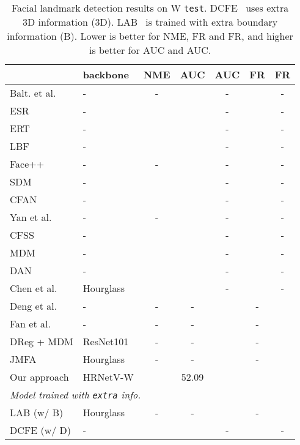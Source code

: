 \documentclass[10pt,twocolumn,letterpaper]{article}
\begin{document}
\renewcommand{\arraystretch}{1.3}
\begin{table}[t]
\setlength{\tabcolsep}{1.8pt}
\scriptsize
\centering
\caption{Facial landmark detection results on W \texttt{test}.
DCFE~\cite{ValleBVB18} uses extra 3D information (3D).
LAB~\cite{Wu0YWC018} is trained with extra boundary information (B).
Lower is better for NME, FR and FR,
and higher is better for AUC and AUC.}
\label{table:comparison_300w_testset}
\begin{tabular}{l|l|c|c|c|c|c}
\hline\noalign{\smallskip}
 & backbone &NME & AUC & AUC & FR & FR\\
\hline

\hline
Balt. et al. \cite{Baltrusaitis0M13} & - & - & &-&  & -\\
ESR \cite{CaoWWS12}& - & &  & - &  & - \\
ERT \cite{KazemiS14}& - & &  & - &  & - \\
LBF \cite{RenCW014}& - & &  & - &  & - \\
Face++ \cite{ZhouFCJY13} & - & - & & - &  & - \\
SDM \cite{XiongT13}& - & &  & - &  & - \\
CFAN \cite{ZhangSKC14}& - & &  & - &  & - \\
Yan et al. \cite{YanLYL13} & -&- &&-&&-\\
CFSS \cite{ZhuLLT15}& - & &  & - &  & - \\
MDM \cite{TrigeorgisSNAZ16}& - & &  & - &  & - \\
DAN \cite{KowalskiNT17}& - & &  & - &  & - \\
Chen et al. \cite{ChenSWLY17}& Hourglass & &  & - &  & - \\
Deng et al. \cite{DengLYT16}& - & - & - &  & - &  \\
Fan et al. \cite{FanZ16}& - &- & - &  & - &  \\
DReg + MDM \cite{GulerTASZK17}& ResNet101 &- & - &  & - &  \\
JMFA \cite{DengTZZ17}&Hourglass &- & - &  & - &  \\
\hline
Our approach & HRNetV-W&   & 52.09  &  &  &   \\
\hline

\hline
\multicolumn{3}{l}{
\emph {Model trained with \texttt{extra} info.}}\\
\hline
LAB (w/ B) \cite{Wu0YWC018}& Hourglass &- & -&  & - &  \\
DCFE (w/ D) \cite{ValleBVB18}& - & &  & - &  & - \\
\hline
\end{tabular}
\end{table}
	
\end{document}
